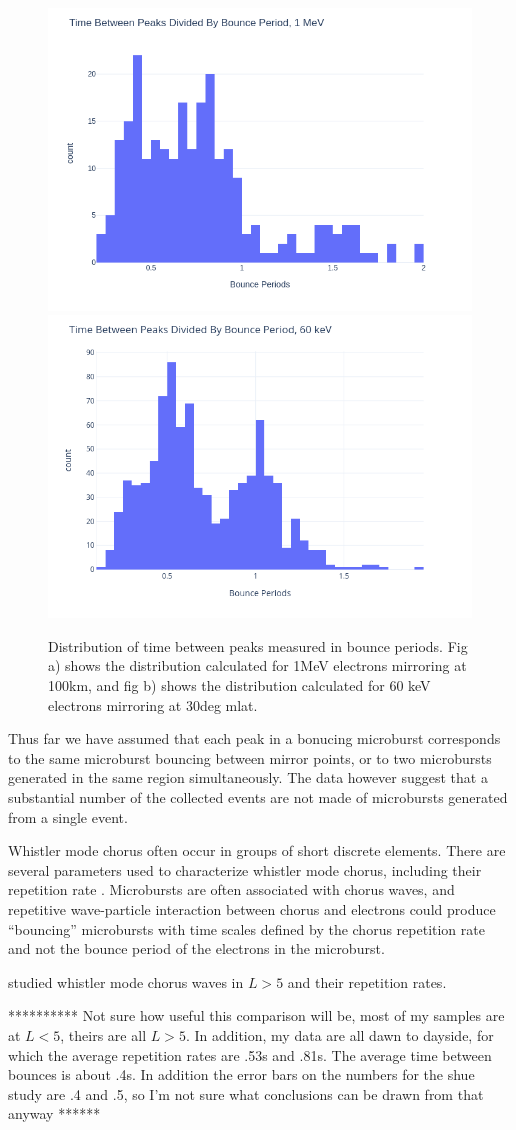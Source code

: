 \documentclass[draft]{agujournal2019}
\begin{document}
\begin{figure}[h!]
\includegraphics[width=.5\textwidth]{period_hist_1_MeV.png}
\includegraphics[width=.5\textwidth]{period_hist_60_keV.png}
\label{fig:periods}
\caption{Distribution of time between peaks measured in bounce periods. Fig a) shows the distribution calculated for 1MeV electrons mirroring at 100km, and fig b) shows the distribution calculated for 60 keV electrons mirroring at 30deg mlat.}
\end{figure} 

Thus far we have assumed that each peak in a bonucing microburst corresponds to the same microburst bouncing between mirror points, or to two microbursts generated in the same region simultaneously.
The data however suggest that a substantial number of the collected events are not made of microbursts generated from a single event.

Whistler mode chorus often occur in groups of short discrete elements. 
There are several parameters used to characterize whistler mode chorus, including their repetition rate \cite{repetition_rate}.  
Microbursts are often associated with chorus waves, and repetitive wave-particle interaction between chorus and electrons could produce ``bouncing'' microbursts with time scales defined by the chorus repetition rate and not the bounce period of the electrons in the microburst.

\cite{repetition_rate} studied whistler mode chorus waves in $L>5$ and their repetition rates. 


**********
Not sure how useful this comparison will be, most of my samples are at $L<5$,  theirs are all $L>5$. In addition,  my data are all dawn to dayside, for which the average repetition rates are .53s and .81s. The average time between bounces is about .4s. In addition the error bars on the numbers for the shue study are .4 and .5, so I'm not sure what conclusions can be drawn from that anyway
******
\end{document}
